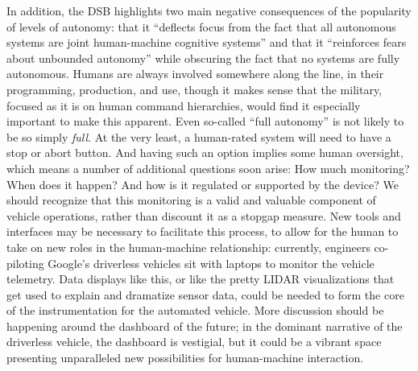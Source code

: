 In addition, the DSB highlights two main negative consequences of the popularity of
levels of autonomy: that it ``deflects focus from the fact that all
autonomous systems are joint human-machine cognitive systems''\cite{???} and
that it ``reinforces fears about unbounded autonomy'' while obscuring
the fact that no systems are fully autonomous\cite{???}. Humans are always
involved somewhere along the line, in their programming, production,
and use, though it makes sense that the military, focused as it is on
human command hierarchies, would find it especially important to make
this apparent. Even so-called ``full autonomy'' is not likely to be so
simply \emph{full}. At the very least, a human-rated system will need to have
a stop or abort button. And having such an option implies some human
oversight, which means a number of additional questions soon arise:
How much monitoring? When does it happen? And how is it
regulated or supported by the device? We should recognize that this
monitoring is a valid and valuable component of vehicle operations,
rather than discount it as a stopgap measure. New tools and interfaces
may be necessary to facilitate this process, to allow for the human to
take on new roles in the human-machine relationship: currently, engineers
co-piloting Google's driverless vehicles sit with laptops to monitor
the vehicle telemetry\cite{???-article-from-DM-class}. Data displays
like this, or like the pretty LIDAR visualizations that get used to
explain and dramatize sensor data, could be needed to form the core of the
instrumentation for the automated vehicle. More discussion should be
happening around the dashboard of the future; in the dominant
narrative of the driverless vehicle, the dashboard is vestigial, but
it could be a vibrant space presenting unparalleled new possibilities
for human-machine interaction.

